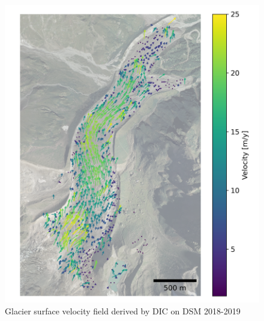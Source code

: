 \begin{figure}
    \centering
    \includegraphics[height=\textheight]{figures/chapter3/velocity_DIC_2018-2019.png}
    \caption[]{Glacier surface velocity field derived by DIC on DSM 2018-2019}
\end{figure}

